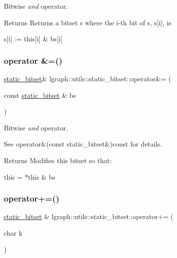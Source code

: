 Bitwise {\itshape and} operator. 

\begin{DoxyReturn}{Returns}
Returns a bitset s where the i-\/th bit of s, s\mbox{[}i\mbox{]}, is \begin{DoxyVerb}s[i] := this[i] & bs[i]\end{DoxyVerb}
 
\end{DoxyReturn}
\mbox{\label{classlgraph_1_1utils_1_1static__bitset_a9be18d0f80ce54324ff6a37e86e125d7}} 
\subsubsection{\texorpdfstring{operator \&=()}{operator \&=()}}
{\footnotesize\ttfamily \hyperlink{classlgraph_1_1utils_1_1static__bitset}{static\+\_\+bitset}\& lgraph\+::utils\+::static\+\_\+bitset\+::operator\&= (\begin{DoxyParamCaption}\item[{const \hyperlink{classlgraph_1_1utils_1_1static__bitset}{static\+\_\+bitset} \&}]{bs }\end{DoxyParamCaption})}



Bitwise {\itshape and} operator. 

See operator\&(const static\+\_\+bitset\&)const for details. \begin{DoxyReturn}{Returns}
Modifies this bitset so that\+: \begin{DoxyVerb}this = *this & bs\end{DoxyVerb}
 
\end{DoxyReturn}
\mbox{\label{classlgraph_1_1utils_1_1static__bitset_a2c595a4b2c3ab2bbd72c1dad0504cc38}} 
\subsubsection{\texorpdfstring{operator+=()}{operator+=()}}
{\footnotesize\ttfamily \hyperlink{classlgraph_1_1utils_1_1static__bitset}{static\+\_\+bitset} \& lgraph\+::utils\+::static\+\_\+bitset\+::operator+= (\begin{DoxyParamCaption}\item[{char}]{k }\end{DoxyParamCaption})}



